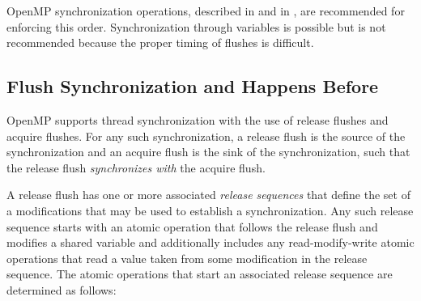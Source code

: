 \begin{note}
OpenMP synchronization operations, described in 
 and in , 
are recommended for enforcing this order. Synchronization 
through variables is possible but is not recommended because the proper timing
of flushes is difficult.
\end{note}


\subsection{Flush Synchronization and Happens Before}
\label{subsec:happens-before}

OpenMP supports thread synchronization with the use of release flushes and
acquire flushes. For any such synchronization, a release flush is the source
of the synchronization and an acquire flush is the sink of the
synchronization, such that the release flush \emph{synchronizes with} the
acquire flush.


A release flush has one or more associated \emph{release sequences} that
define the set of a modifications that may be used to establish a
synchronization. Any such release sequence starts with an atomic operation
that follows the release flush and modifies a shared variable and additionally
includes any read-modify-write atomic operations that read a value taken from
some modification in the release sequence. The atomic operations that start an
associated release sequence are determined as follows:

